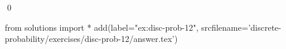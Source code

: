 
\begin{ex} 
  \label{ex:disc-prob-12}
  
  \qed
\end{ex} 
\begin{python0}
from solutions import *
add(label="ex:disc-prob-12",
    srcfilename='discrete-probability/exercises/disc-prob-12/answer.tex') 
\end{python0}
